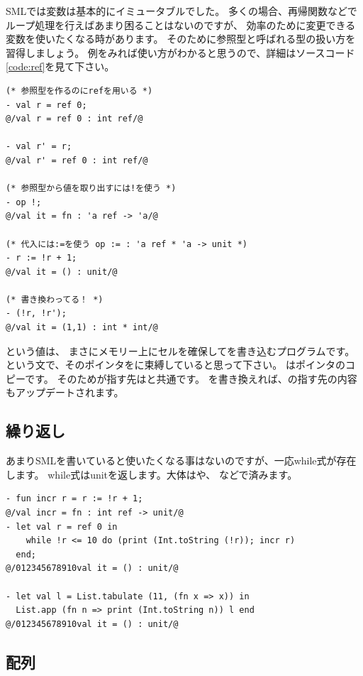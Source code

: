 \documentclass[11pt,a4paper]{jarticle}
\begin{document}
SMLでは変数は基本的にイミュータブルでした。
多くの場合、再帰関数などでループ処理を行えばあまり困ることはないのですが、
効率のために変更できる変数を使いたくなる時があります。
そのために参照型と呼ばれる型の扱い方を習得しましょう。
例をみれば使い方がわかると思うので、詳細はソースコード\ref{code:ref}を見て下さい。

\begin{lstlisting}[caption=ref型,label=code:ref]
(* 参照型を作るのにrefを用いる *)
- val r = ref 0;
@/val r = ref 0 : int ref/@

- val r' = r;
@/val r' = ref 0 : int ref/@

(* 参照型から値を取り出すには!を使う *)
- op !;
@/val it = fn : 'a ref -> 'a/@

(* 代入には:=を使う op := : 'a ref * 'a -> unit *)
- r := !r + 1;
@/val it = () : unit/@

(* 書き換わってる！ *)
- (!r, !r');
@/val it = (1,1) : int * int/@
\end{lstlisting}

という値は、
まさにメモリー上にセルを確保してを書き込むプログラムです。
という文で、そのポインタをに束縛していると思って下さい。
はポインタのコピーです。
そのためが指す先はと共通です。
を書き換えれば、の指す先の内容もアップデートされます。

\subsection{繰り返し}

あまりSMLを書いていると使いたくなる事はないのですが、一応while式が存在します。
while式はunitを返します。大体はや、
などで済みます。

\begin{lstlisting}[caption=while式,label=code:while]
- fun incr r = r := !r + 1;
@/val incr = fn : int ref -> unit/@
- let val r = ref 0 in
    while !r <= 10 do (print (Int.toString (!r)); incr r)
  end;
@/012345678910val it = () : unit/@

- let val l = List.tabulate (11, (fn x => x)) in
  List.app (fn n => print (Int.toString n)) l end
@/012345678910val it = () : unit/@
\end{lstlisting}

\subsection{配列}
\end{document}
